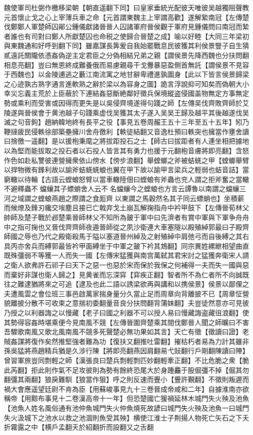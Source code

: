 魏使軍司杜弼作檄移梁朝【朝直遥翻下同】曰皇家垂統光配彼天唯彼吴越獨阻聲教元首懷止戈之心上宰薄兵車之命【元首謂東魏主上宰謂高歡】遂解縶南冠【左傳楚伐鄭鄭人軍楚師囚鄖公鍾儀獻諸晉晉人囚諸軍府晉侯觀于軍府見鍾儀問曰南冠而縶者誰也有司對曰鄭人所獻楚囚也命税之使歸合晉楚之成】喻以好睦【大同三年梁初與東魏通和好呼到翻下同】雖嘉謀長筭爰自我始罷戰息民彼獲其利侯景豎子自生猜貳遠託關隴依憑姦偽逆主定君臣之分偽相結兄弟之親【謂侯景先降西魏也分扶問翻相息亮翻】豈曰無恩終成難養俄而易慮親尋干戈釁暴惡盈側首無託【謂侯景不見容于西魏也】以金陵逋逃之藪江南流寓之地甘辭卑禮進孰圖身【此以下皆言侯景歸梁之心迹孰古熟字通言進軟熟之辭於梁以為容身之圖】詭言浮說抑可知矣而偽朝大小幸災忘義主荒於上臣蔽於下連結姦惡斷絶鄰好徵兵保境縱盗侵國盖物無定方事無定勢或乘利而受害或因得而更失是以吳侵齊境遂得句踐之師【左傳吴伐齊敗齊師於艾陵遂與晉侯會于黄池越子句踐乘虚伐吴獲其太子遂入吴吴王歸及越平其後越遂伐吴滅之句音鉤】趙納韓地終有長平之役【事見五卷周赧王五十三年至五十五年】矧乃鞭撻疲民侵軼徐部築壘擁川舍舟徼利【軼徒結翻又音逸杜預曰軼突也擁當作壅舍讀曰捨徼一遥翻】是以援枹秉麾之將拔距投石之士【師古曰拔距者有人連坐相把據地以為堅而能拔取之投石者以石投人皆言其有勇力也援于元翻枹音膚將即亮翻】含怒作色如赴私讐彼連營擁衆依山傍水【傍步浪翻】舉螳螂之斧被蛣蜣之甲【螳螂舉臂以捍物微有鋒利故以諭斧蛣蜣蜣蜋也翼在甲下故以諭甲言梁兵之輕弱也蛣音詰】當窮轍以待輪【古語云螳蜋怒臂以當車轍陸佃曰螳蜋有斧蟲也兖人謂之拒斧奮之當轍不避釋蟲不蟷蠰其子螵蛸舍人云不名蟷蠰今之螳蜋也方言云譚魯以南謂之蟷蠰三河之域謂之螳蜋燕趙之際謂之食厖齊以東謂之馬穀然名其子同云螵蛸也】坐積薪而候燎及鋒刃纔交埃塵且接已亡戟弃戈土崩瓦解掬指舟中衿甲鼓下【左傳晉荀林父帥師及楚子戰於邲楚乘晉師林父不知所為皷于軍中曰先濟者有賞中軍與下軍争舟舟中之指可掬也又晉伐齊齊師夜遁晉師從之夙沙衛連大車塞隧以殿殖綽郭最曰子殿齊師國之辱也乃代之殿衛殺馬于隘以塞道晉州綽及之射殖綽中肩弛弓而自後縛之其右具丙亦舍兵而縛郭最皆衿甲面縛坐于中軍之皷下衿其鴆翻】同宗異姓縲紲相望曲直既殊彊弱不等獲一人而失一國【左傳宋猛獲與南宫萬弑其君宋討之猛獲奔衛宋人請之衛人欲弗許石祁子曰天下之惡一也惡於宋而保於我保之何補得一夫而失一國與惡而棄好非謀也衛人歸之】見黄雀而忘深穽【穽疾正翻】智者所不為仁者所不向誠既往之難逮猶將來之可追【逮及也此二語以誘梁欲再與講和以携侯景】侯景以鄙俚之夫遭風雲之會位班三事邑啟萬家揣身量分久當止足而周章向背離披不已【周章怔營貌離披分散不可收束之意揣初委翻量音良分扶問翻背蒲妹翻】夫豈徒然意亦可見彼乃授之以利器誨之以慢藏【老子曰國之利器不可以授人易曰慢藏誨盗藏徂浪翻】使其勢得容姦時堪乘便今見南風不競【左傳晉圍齊楚乘其間伐鄭晉人聞之師曠曰不害吾驟歌南風又歌北風南風不競多死聲楚必無功果如其言】天亡有徵【徵讀曰證】老賊姦謀將復作矣然推堅強者難為功【復扶又翻推吐雷翻】摧枯朽者易為力計其雖非孫吳猛將燕趙精兵猶是久涉行陳【將即亮翻燕因肩翻易弋䜴翻行戶剛翻陳讀曰陣】曾習軍旅豈同剽輕之師【漢張良曰楚兵剽輕剽匹妙翻輕牽正翻】不比危脆之衆【脆此芮翻】拒此則作氣不足攻彼則為勢有餘終恐尾大於身踵麤于股倔彊不掉【倔其勿翻彊其兩翻】狼戾難馴【狼當作狠】呼之則反速而舋小【舋許覲翻】不徵則叛遲而禍大會應遥望廷尉不肯為臣【用蘇峻事見九十三卷晉成帝咸和二年】自據淮南亦欲稱帝【用黥布事見十二卷漢高帝十一年】但恐楚國亡猨禍延林木城門失火殃及池魚【池魚人姓名風俗通有池仲魚城門失火仲魚燒死故諺曰城門失火殃及池魚一曰城門失火汲城下之池水以救之池涸則魚受其殃】横使江淮士子荆揚人物死亡矢石之下夭折霧露之中【横戶孟翻夭於紹翻折而設翻又之舌翻